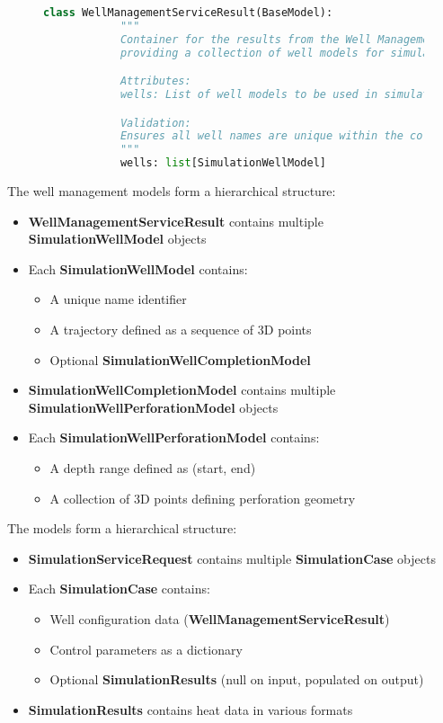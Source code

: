 \begin{enumerate}
	\begin{figure}[H]
		\begin{lstlisting}[language=Python, caption={WellManagementServiceResult Model}]
			class WellManagementServiceResult(BaseModel):
			"""
			Container for the results from the Well Management Service,
			providing a collection of well models for simulation.

			Attributes:
			wells: List of well models to be used in simulation

			Validation:
			Ensures all well names are unique within the collection
			"""
			wells: list[SimulationWellModel]
		\end{lstlisting}
	\end{figure}

	The well management models form a hierarchical structure:

	\begin{itemize}
		\item \textbf{WellManagementServiceResult} contains multiple \textbf{SimulationWellModel} objects
		\item Each \textbf{SimulationWellModel} contains:
		\begin{itemize}
			\item A unique name identifier
			\item A trajectory defined as a sequence of 3D points
			\item Optional \textbf{SimulationWellCompletionModel}
		\end{itemize}
		\item \textbf{SimulationWellCompletionModel} contains multiple \textbf{SimulationWellPerforationModel} objects
		\item Each \textbf{SimulationWellPerforationModel} contains:
		\begin{itemize}
			\item A depth range defined as (start, end)
			\item A collection of 3D points defining perforation geometry
		\end{itemize}
	\end{itemize}
\end{enumerate}

\bigskip

The models form a hierarchical structure:

\begin{itemize}
	\item \textbf{SimulationServiceRequest} contains multiple \textbf{SimulationCase} objects
	\item Each \textbf{SimulationCase} contains:
	\begin{itemize}
		\item Well configuration data (\textbf{WellManagementServiceResult})
		\item Control parameters as a dictionary
		\item Optional \textbf{SimulationResults} (null on input, populated on output)
	\end{itemize}
	\item \textbf{SimulationResults} contains heat data in various formats
\end{itemize}




